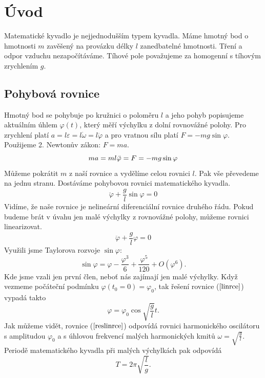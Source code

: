 \section{Úvod}
\label{sec:Úvod}

Matematické kyvadlo je nejjednodušším typem kyvadla. Máme hmotný bod o hmotnosti $m$ zavěšený na provázku délky $l$ zanedbatelné hmotnosti. Tření a odpor vzduchu nezapočítáváme. Tíhové pole považujeme za homogenní s tíhovým zrychlením $g$.

\subsection*{Pohybová rovnice}
\label{sec:Pohybová rovnice}
Hmotný bod se pohybuje po kružnici o poloměru $l$ a jeho pohyb popisujeme aktuálním úhlem $\varphi(t)$, který měří výchylku z dolní rovnovážné polohy. Pro zrychlení platí $a=l\varepsilon=l\dot{\omega}=l\ddot{\varphi}$ a pro vratnou sílu platí $F=-mg\sin\varphi$. Použijeme 2. Newtonův zákon: $F=ma$.
\begin{equation*}
ma=ml\ddot{\varphi}=F=-mg\sin\varphi\\
\end{equation*}
Můžeme pokrátit $m$ z naší rovnice a vydělíme celou rovnici $l$. Pak vše převedeme na jednu stranu. Dostáváme pohybovou rovnici matematického kyvadla.
\begin{equation}
\label{pohyb}
\boxed{\ddot{\varphi}+\frac{g}{l}\sin\varphi=0}
\end{equation}
Vidíme, že naše rovnice je nelineární diferenciální rovnice druhého řádu. Pokud budeme brát v úvahu jen malé výchylky z rovnovážné polohy, můžeme rovnici linearizovat.
\begin{equation}
\label{linrce}
\ddot{\varphi}+\frac{g}{l}\varphi=0
\end{equation}
Využili jsme Taylorova rozvoje $\sin\varphi$:
\begin{equation*}
\sin\varphi = \varphi-\frac{\varphi^3}{6}+\frac{\varphi^5}{120}+O\left(\varphi^6\right).
\end{equation*}
Kde jsme vzali jen první člen, neboť nás zajímají jen malé výchylky. Když vezmeme počáteční podmínku $\varphi(t_0=0)=\varphi_0$, tak řešení rovnice ($\ref{linrce}$) vypadá takto
\begin{equation}
\label{reslinrce}
\varphi=\varphi_0\cos\sqrt{\frac{g}{l}}t.
\end{equation}
Jak můžeme vidět, rovnice ($\ref{reslinrce}$) odpovídá rovnici harmonického oscilátoru s amplitudou $\varphi_0$ a s úhlovou frekvencí malých harmonických kmitů $\omega = \sqrt{\frac{g}{l}}$.
Periodě matematického kyvadla při malých výchylkách pak odpovídá
\begin{equation}
\label{malperiod}
T=2\pi\sqrt{\frac{l}{g}}.
\end{equation}

